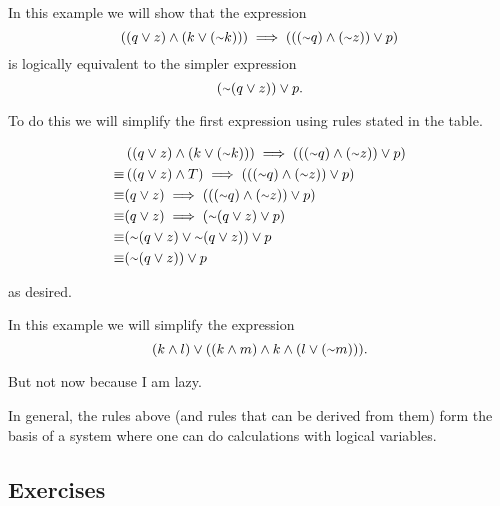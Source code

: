 \begin{example}
In this example we will show that the expression
\[\left((q \lor z) \land (k \lor (\shortsim k))\right) \implies \left(((\shortsim q) \land (\shortsim z)) \lor p\right)\]
is logically equivalent to the simpler expression 
\[(\shortsim(q \lor z)) \lor p.\]

To do this we will simplify the first expression using rules stated in the table.

\begin{align*}
& \left((q \lor z) \land (k \lor (\shortsim k))\right) \implies \left(((\shortsim q) \land (\shortsim z)) \lor p\right) \\
\equiv& \left((q \lor z) \land T\right) \implies \left(((\shortsim q) \land (\shortsim z)) \lor p\right) \\
\equiv& (q \lor z) \implies \left(((\shortsim q) \land (\shortsim z)) \lor p\right) \\
\equiv& (q \lor z) \implies \left(\shortsim(q \lor z) \lor p\right) \\
\equiv& (\shortsim(q \lor z) \lor \shortsim(q \lor z)) \lor p \\
\equiv& (\shortsim(q \lor z)) \lor p
\end{align*}

as desired.
\end{example}

\begin{example}
In this example we will simplify the expression 
\[(k \land l) \lor ((k \land m) \land k \land (l \lor (\shortsim m))).\]

But not now because I am lazy.
\end{example}

In general, the rules above (and rules that can be derived from them) form the basis of a system where one can do calculations with logical variables.

\subsection{Exercises}
